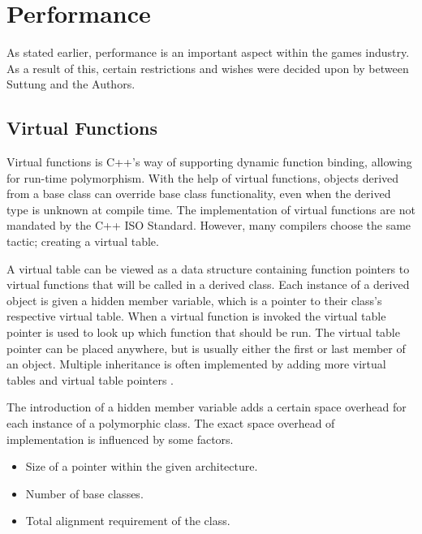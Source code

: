 
\section{Performance}
As stated earlier, performance is an important aspect within the games industry.
As a result of this, certain restrictions and wishes were decided upon by between Suttung and the Authors.

\subsection{Virtual Functions}
\label{subsec:requirements_performance_virtual_functions}
Virtual functions is C++'s way of supporting dynamic function binding, allowing for run-time polymorphism.
With the help of virtual functions, objects derived from a base class can override base class functionality,
even when the derived type is unknown at compile time.
The implementation of virtual functions are not mandated by the C++ ISO Standard.
However, many compilers choose the same tactic; creating a virtual table\cite{wikipedia_virtual_method_table}\cite[p. 140]{game_engine_architecture}.

A virtual table can be viewed as a data structure containing function pointers to virtual functions that will be called in a derived class.
Each instance of a derived object is given a hidden member variable, which is a pointer to their class's respective virtual table.
When a virtual function is invoked the virtual table pointer is used to look up which function that should be run.
The virtual table pointer can be placed anywhere, but is usually either the first or last member of an object.
Multiple inheritance is often implemented by adding more virtual tables and virtual table pointers\cite{codersource_virtual_functions}
\cite[31:12]{andrei_alexandrescu_quick_code_quickly}.

The introduction of a hidden member variable adds a certain space overhead for each instance of a polymorphic class.
The exact space overhead of implementation is influenced by some factors.
\begin{itemize}
    \item
    Size of a pointer within the given architecture.

    \item
    Number of base classes.

    \item
    Total alignment requirement of the class.
\end{itemize}

